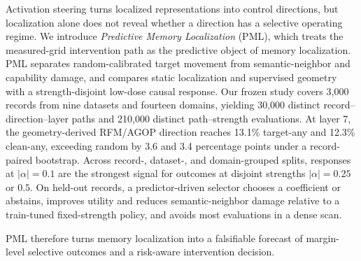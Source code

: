 Activation steering turns localized representations into control directions,
but localization alone does not reveal whether a direction has a selective
operating regime. We introduce \emph{Predictive Memory Localization} (PML),
which treats the measured-grid intervention path as the predictive object of
memory localization. PML separates random-calibrated target movement from
semantic-neighbor and capability damage, and compares static localization and
supervised geometry with a strength-disjoint low-dose causal response. Our
frozen study covers 3,000 records from nine datasets and fourteen domains,
yielding 30,000 distinct record--direction--layer paths and 210,000 distinct
path--strength evaluations. At layer 7, the geometry-derived RFM/AGOP direction reaches 13.1\% target-any and
12.3\% clean-any, exceeding random by 3.6 and 3.4 percentage points under a
record-paired bootstrap. Across record-, dataset-, and domain-grouped splits,
responses at $|\alpha|=0.1$ are the strongest signal for outcomes at disjoint strengths
$|\alpha| = 0.25$ or $0.5$. On held-out records, a predictor-driven selector
chooses a coefficient or abstains, improves utility and reduces
semantic-neighbor damage relative to a train-tuned fixed-strength policy, and
avoids most evaluations in a dense scan.

PML therefore turns memory localization into a falsifiable forecast of
margin-level selective outcomes and a risk-aware intervention decision.
